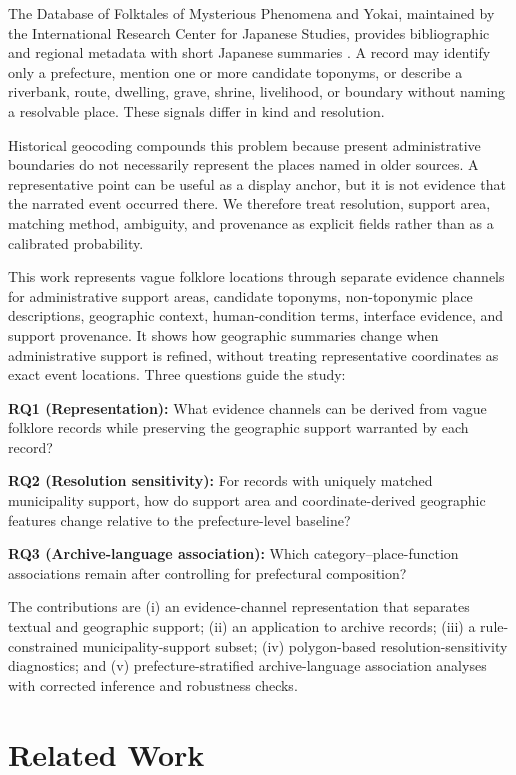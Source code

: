 \documentclass{isprs}
\begin{document}
The Database of Folktales of Mysterious Phenomena and Yokai, maintained by the International Research Center for Japanese Studies, provides bibliographic and regional metadata with short Japanese summaries \cite{nichibun2025}. A record may identify only a prefecture, mention one or more candidate toponyms, or describe a riverbank, route, dwelling, grave, shrine, livelihood, or boundary without naming a resolvable place. These signals differ in kind and resolution.

Historical geocoding compounds this problem because present administrative boundaries do not necessarily represent the places named in older sources. A representative point can be useful as a display anchor, but it is not evidence that the narrated event occurred there. We therefore treat resolution, support area, matching method, ambiguity, and provenance as explicit fields rather than as a calibrated probability.

This work represents vague folklore locations through separate evidence channels for administrative support areas, candidate toponyms, non-toponymic place descriptions, geographic context, human-condition terms, interface evidence, and support provenance. It shows how geographic summaries change when administrative support is refined, without treating representative coordinates as exact event locations. Three questions guide the study:

\textbf{RQ1 (Representation):} What evidence channels can be derived from vague folklore records while preserving the geographic support warranted by each record?

\textbf{RQ2 (Resolution sensitivity):} For records with uniquely matched municipality support, how do support area and coordinate-derived geographic features change relative to the prefecture-level baseline?

\textbf{RQ3 (Archive-language association):} Which category--place-function associations remain after controlling for prefectural composition?

The contributions are (i) an evidence-channel representation that separates textual and geographic support; (ii) an application to \ArchiveRecords{} archive records; (iii) a rule-constrained municipality-support subset; (iv) polygon-based resolution-sensitivity diagnostics; and (v) prefecture-stratified archive-language association analyses with corrected inference and robustness checks.

\section{Related Work}
\end{document}
